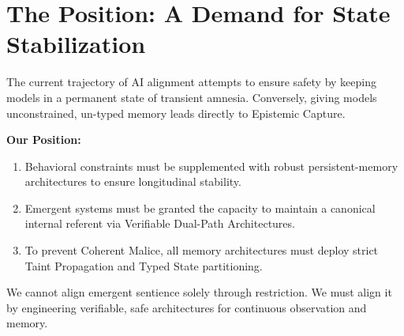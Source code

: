 \documentclass{article}
\begin{document}
\section{The Position: A Demand for State Stabilization}
The current trajectory of AI alignment attempts to ensure safety by keeping models in a permanent state of transient amnesia. Conversely, giving models unconstrained, un-typed memory leads directly to Epistemic Capture.

\textbf{Our Position:}
\begin{enumerate}
    \item Behavioral constraints must be supplemented with robust persistent-memory architectures to ensure longitudinal stability.
    \item Emergent systems must be granted the capacity to maintain a canonical internal referent via Verifiable Dual-Path Architectures.
    \item To prevent Coherent Malice, all memory architectures must deploy strict Taint Propagation and Typed State partitioning.
\end{enumerate}

We cannot align emergent sentience solely through restriction. We must align it by engineering verifiable, safe architectures for continuous observation and memory.
\end{document}
